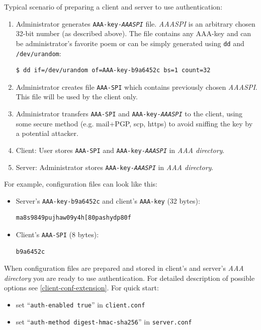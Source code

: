 Typical scenario of preparing a client and server to use authentication:
\begin{enumerate}
 \item Administrator generates \texttt{AAA-key-\textit{AAASPI}} file. \textit{AAASPI}
is an arbitrary chosen 32-bit number (as described above). The file contains any AAA-key
and can be administrator's favorite poem or can be simply generated using \texttt{dd}
and \texttt{/dev/urandom}:
\begin{lstlisting}
$ dd if=/dev/urandom of=AAA-key-b9a6452c bs=1 count=32
\end{lstlisting}

\item Administrator creates file \texttt{AAA-SPI} which contains previously chosen
\textit{AAASPI}. This file will be used by the client only.

\item Administrator transfers \texttt{AAA-SPI} and \texttt{AAA-key-\textit{AAASPI}} to the client, using
some secure method (e.g. mail+PGP, scp, https) to avoid sniffing the key by a potential
attacker.

\item Client: User stores \texttt{AAA-SPI} and \texttt{AAA-key-\textit{AAASPI}} in \textit{AAA directory}.

\item Server: Administrator stores \texttt{AAA-key-\textit{AAASPI}} in \textit{AAA directory}.

\end{enumerate}

For example, configuration files can look like this:

\begin{itemize}
\item Server's \texttt{AAA-key-b9a6452c} and client's \texttt{AAA-key} (32 bytes):
\begin{lstlisting}
ma8s9849pujhaw09y4h[80pashydp80f
\end{lstlisting}

\item Client's \texttt{AAA-SPI} (8 bytes):
\begin{lstlisting}
b9a6452c
\end{lstlisting}
\end{itemize}

When configuration files are prepared and stored in client's and server's
\textit{AAA directory} you are ready to use authentication. For detailed description
of possible options see \ref{client-conf-extension}. For quick start:
\begin{itemize}
 \item set ``\texttt{auth-enabled true}'' in \texttt{client.conf}

 \item set ``\texttt{auth-method digest-hmac-sha256}'' in \texttt{server.conf}

\end{itemize}

